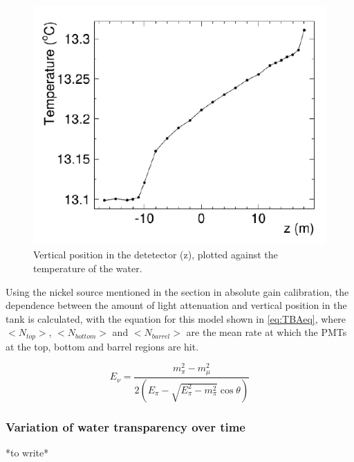\begin{figure}
    \includegraphics[width=\textwidth]{Figures/watergrad.png}
\caption{Vertical position in the detetector (z), plotted against the temperature of the water.}
    \label{fig:watergrad}
\end{figure}

Using the nickel source mentioned in the section in absolute gain calibration, the dependence between the amount of light attenuation and vertical position in the tank is calculated, with the equation for this model shown in \ref{eq:TBAeq}, where $<N_{top}>$, $<N_{bottom}>$ and $<N_{barrel}>$ are the mean rate at which the PMTs at the top, bottom and barrel regions are hit.  

\begin{equation}
    E_{\nu}=\frac{m_{\pi}^{2}-m_{\mu}^{2}}{2\left(E_{\pi}-\sqrt{E_{\pi}^{2}-m_{\pi}^{2}} \cos \theta\right)}
\label{eq:TBAeq}
\end{equation}

\subsubsection{Variation of water transparency over time}

*to write*